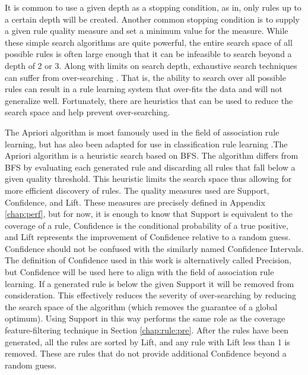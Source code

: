 It is common to use a given depth as a stopping condition, as in, only rules up to a certain depth will be created. Another common stopping condition is to supply a given rule quality measure and set a minimum value for the measure. While these simple search algorithms are quite powerful, the entire search space of all possible rules is often large enough that it can be infeasible to search beyond a depth of 2 or 3.
Along with limits on search depth, exhaustive search techniques can suffer from over-searching \cite{quinlan1995oversearching} \cite{janssen2008oversearching}. That is, the ability to search over all possible rules can result in a rule learning system that over-fits the data and will not generalize well.
 Fortunately, there are heuristics that can be used to reduce the search space and help prevent over-searching.

 The Apriori algorithm \cite{agrawal1996fast} is most famously used in the field of association rule learning, but has also been adapted for use in classification rule learning \cite{liu1998integrating} \cite{liu2000improving} \cite{jovanoski2001classification}.The Apriori algorithm is a heuristic search based on BFS. The algorithm differs from BFS by evaluating each generated rule and discarding all rules that fall below a given quality threshold. This heuristic limits the search space thus allowing for more efficient discovery of rules. The quality measures used are Support, Confidence, and Lift. These measures are precisely defined in Appendix \ref{chap:perf}, but for now, it is enough to know that Support is equivalent to the coverage of a rule, Confidence is the conditional probability of a true positive, and Lift represents the improvement of Confidence relative to a random guess.
 Confidence should not be confused with the similarly named Confidence Intervals. The definition of Confidence used in this work is alternatively called Precision, but Confidence will be used here to align with the field of association rule learning.
 If a generated rule is below the given Support it will be removed from consideration. This effectively reduces the severity of over-searching by reducing the search space of the algorithm (which removes the guarantee of a global optimum). Using Support in this way performs the same role as the coverage feature-filtering technique in Section \ref{chap:rule:pre}. After the rules have been generated, all the rules are sorted by Lift, and any rule with Lift less than 1 is removed. These are rules that do not provide additional Confidence beyond a random guess.

